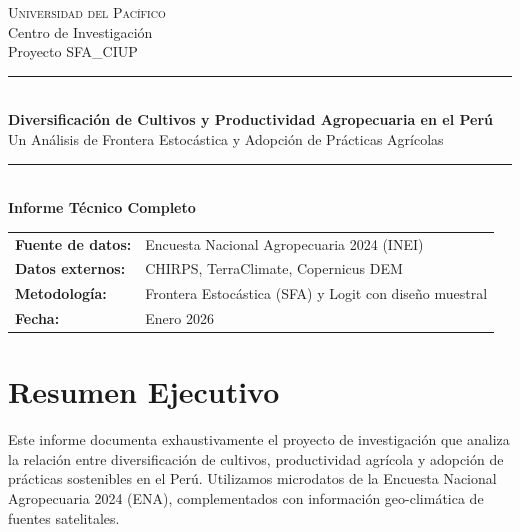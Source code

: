 \documentclass[11pt,a4paper]{article}
\begin{document}
\begin{titlepage}
    \centering
    \vspace*{1cm}
    
    {\Large\textsc{Universidad del Pacífico}}\\[0.2cm]
    {\normalsize Centro de Investigación}\\[0.5cm]
    {\small Proyecto SFA\_CIUP}\\[2cm]
    
    \rule{\linewidth}{0.5mm}\\[0.4cm]
    {\LARGE\bfseries Diversificación de Cultivos y Productividad Agropecuaria en el Perú}\\[0.3cm]
    {\Large Un Análisis de Frontera Estocástica y Adopción de Prácticas Agrícolas}\\[0.3cm]
    \rule{\linewidth}{0.5mm}\\[1.5cm]
    
    {\large\textbf{Informe Técnico Completo}}\\[0.5cm]
    
    \vfill
    
    \begin{tabular}{ll}
        \textbf{Fuente de datos:} & Encuesta Nacional Agropecuaria 2024 (INEI) \\
        \textbf{Datos externos:} & CHIRPS, TerraClimate, Copernicus DEM \\
        \textbf{Metodología:} & Frontera Estocástica (SFA) y Logit con diseño muestral \\
        \textbf{Fecha:} & Enero 2026 \\
    \end{tabular}
    
    \vspace{1cm}
\end{titlepage}

\tableofcontents
\newpage

\section{Resumen Ejecutivo}

Este informe documenta exhaustivamente el proyecto de investigación que analiza la relación entre diversificación de cultivos, productividad agrícola y adopción de prácticas sostenibles en el Perú. Utilizamos microdatos de la Encuesta Nacional Agropecuaria 2024 (ENA), complementados con información geo-climática de fuentes satelitales.
\end{document}

